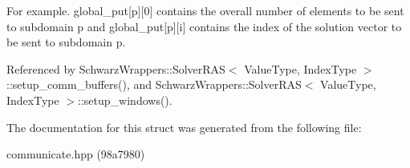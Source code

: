For example. global\+\_\+put\mbox{[}p\mbox{]}\mbox{[}0\mbox{]} contains the overall number of elements to be sent to subdomain p and global\+\_\+put\mbox{[}p\mbox{]}\mbox{[}i\mbox{]} contains the index of the solution vector to be sent to subdomain p. 

Referenced by Schwarz\+Wrappers\+::\+Solver\+R\+A\+S$<$ Value\+Type, Index\+Type $>$\+::setup\+\_\+comm\+\_\+buffers(), and Schwarz\+Wrappers\+::\+Solver\+R\+A\+S$<$ Value\+Type, Index\+Type $>$\+::setup\+\_\+windows().



The documentation for this struct was generated from the following file\+:\begin{DoxyCompactItemize}
\item 
communicate.\+hpp (98a7980)\end{DoxyCompactItemize}
